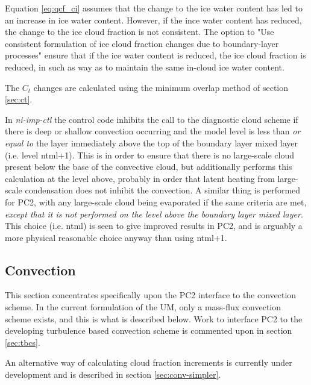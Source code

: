 \documentclass{UMDP_article}
\begin{document}
Equation \ref{eq:qcf_ci} assumes that the change to the ice water content has led to an increase in ice water content.  
However, if the ince water content has reduced, the change to the ice cloud fraction is not consistent.  
The option to "Use consistent formulation of ice cloud fraction changes due to boundary-layer processes" ensure that 
if the ice water content is reduced, the ice cloud fraction is reduced, in such as way as to maintain 
the same in-cloud ice water content.  

The $C_t$ changes are calculated using the minimum overlap method of
section \ref{sec:ct}.

In \textit{ni-imp-ctl} the control code inhibits the
call to the diagnostic cloud scheme
if there is deep or shallow convection occurring and the model level
is less than \textit{or equal to} the layer immediately above the top of the
boundary layer mixed layer (i.e. level ntml+1). This is in order to
ensure that there is
no large-scale cloud present below the base of the convective cloud, but
additionally performs this calculation at the level above, probably
in order that latent heating from large-scale condensation does not
inhibit the convection. A similar thing is performed for PC2, with
any large-scale cloud being evaporated if the same criteria are met,
\textit{except that it is not performed on the level above the boundary
layer mixed layer}. This choice (i.e. ntml) is seen to give improved
results in PC2, and is arguably a more physical reasonable choice
anyway than using ntml+1.

\subsection{Convection}
\label{sec:convec}

This section concentrates specifically upon the PC2 interface to the
convection scheme. In the current formulation of the UM, only a
mass-flux convection scheme exists, and this is what is described
below. Work to interface PC2 to the developing turbulence based
convection scheme is commented upon in section \ref{sec:tbcs}.

An alternative way of calculating cloud fraction increments is currently under development and 
is described in section \ref{sec:conv-simpler}.
\end{document}

